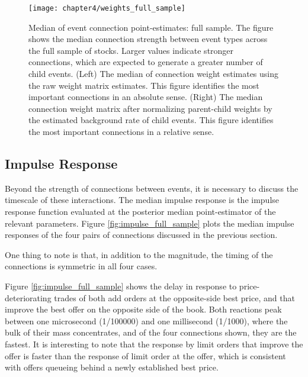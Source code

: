 		\begin{sidewaysfigure}[ht!]
			\small
			\linespread{1}
			\centering
			\texttt{[image: chapter4/weights\_full\_sample]}
			\captionsetup{position=below, font=footnotesize, justification=justified, width=\linewidth, skip=-20pt}
			\caption[Median of event connection point-estimates: full sample]{Median of event connection point-estimates: full sample. The figure shows the median connection strength between event types across the full sample of stocks. Larger values indicate stronger connections, which are expected to generate a greater number of child events. (Left) The median of connection weight estimates using the raw weight matrix estimates. This figure identifies the most important connections in an absolute sense. (Right) The median connection weight matrix after normalizing parent-child weights by the estimated background rate of child events. This figure identifies the most important connections in a relative sense.}
			\label{fig:weights_full_sample}
		\end{sidewaysfigure}

	\subsection{Impulse Response}
		Beyond the strength of connections between events, it is necessary to discuss the timescale of these interactions. The median impulse response is the impulse response function evaluated at the posterior median point-estimator of the relevant parameters. Figure \ref{fig:impulse_full_sample} plots the median impulse responses of the four pairs of connections discussed in the previous section.

		One thing to note is that, in addition to the magnitude, the timing of the connections is symmetric in all four cases.

		Figure \ref{fig:impulse_full_sample} shows the delay in response to price-deteriorating trades of both add orders at the opposite-side best price, and that improve the best offer on the opposite side of the book. Both reactions peak between one microsecond (1/100000) and one millisecond (1/1000), where the bulk of their mass concentrates, and of the four connections shown, they are the fastest. It is interesting to note that the response by limit orders that improve the offer is faster than the response of limit order at the offer, which is consistent with offers queueing behind a newly established best price.

